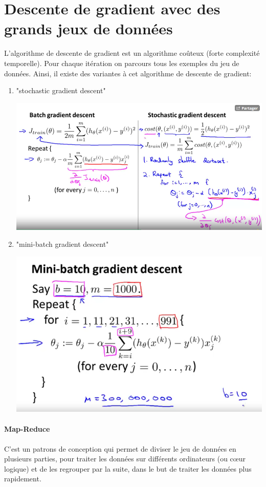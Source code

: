 \documentclass{article}
\theoremstyle{definition}
\begin{document}
\section{Descente de gradient avec des grands jeux de données}
L'algorithme de descente de gradient est un algorithme coûteux (forte complexité temporelle). Pour chaque itération on parcours tous les exemples du jeu de données. Ainsi, il existe des variantes à cet algorithme de descente de gradient:
\begin{enumerate}
\item "stochastic gradient descent"
\begin{center}
\includegraphics[scale=0.4]{stochastic}
\end{center}
\item "mini-batch gradient descent"
\begin{center}
\includegraphics[scale=0.5]{minibatch} 
\end{center}
\end{enumerate}
\paragraph{Map-Reduce} C'est un patrons de conception qui permet de diviser le jeu de données en plusieurs parties, pour traiter les données sur différents ordinateurs (ou cœur logique) et de les regrouper par la suite, dans le but de traiter les données plus rapidement. \par
\newpage
\end{document}
